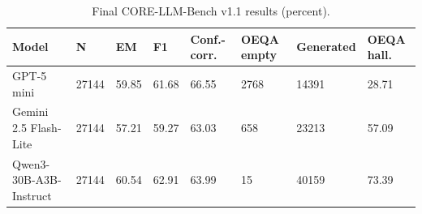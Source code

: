 \begin{table}[t]
\centering
\small
\begin{tabular}{llllllll}
\toprule
Model & N & EM & F1 & Conf.-corr. & OEQA empty & Generated & OEQA hall. \\
\midrule
GPT-5 mini & 27144 & 59.85 & 61.68 & 66.55 & 2768 & 14391 & 28.71 \\
Gemini 2.5 Flash-Lite & 27144 & 57.21 & 59.27 & 63.03 & 658 & 23213 & 57.09 \\
Qwen3-30B-A3B-Instruct & 27144 & 60.54 & 62.91 & 63.99 & 15 & 40159 & 73.39 \\
\bottomrule
\end{tabular}
\caption{Final CORE-LLM-Bench v1.1 results (percent).}
\label{tab:core-v11-overall}
\end{table}
